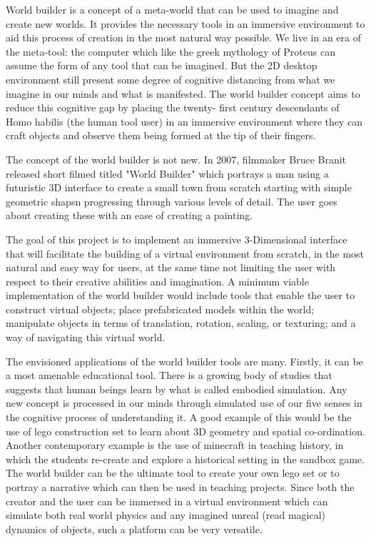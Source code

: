 World builder is a concept of a meta-world that can be used to imagine and create new worlds. It provides the necessary tools in an immersive
environment to aid this process of creation in the most natural way possible. We live in an era of the meta-tool: the computer which like the greek 
mythology of Proteus can assume the form of any tool that can be imagined. But the 2D desktop environment still present some degree of cognitive 
distancing from what we imagine in our minds and what is manifested. The world builder concept aims to reduce this cognitive gap by placing the twenty-
first century descendants of Homo habilis (the human tool user) in an immersive environment where they can craft objects and observe them being formed
at the tip of their fingers.


The concept of the world builder is not new. In 2007, filmmaker Bruce Branit released short filmed titled "World Builder" \cite{video:WorldBuilder}
which portrays a man using a futuristic 3D interface to create a small town from scratch starting with simple geometric shapsn progressing through
various levels of detail.  The user goes about creating these with an ease of creating a painting.


The goal of this project is to implement an immersive 3-Dimensional interface that will facilitate the building of a virtual environment from scratch, in
the most natural and easy way for users, at the same time not limiting the user with respect to their creative abilities and imagination. A 
minimum viable implementation of the world builder would include tools that enable the user to construct virtual objects; place prefabricated models 
within the world; manipulate objects in terms of translation, rotation, scaling, or texturing; and a way of navigating this virtual world.


The envisioned applications of the world builder tools are many. Firstly, it can be a most amenable educational tool. There is a growing body of studies 
that suggests that human beings learn by what is called embodied simulation. Any new concept is processed in our minds through simulated use of our five
senses in the cognitive process of understanding it. A good example of this would be the use of lego construction set to learn about 3D geometry and 
spatial co-ordination.  Another contemporary example is the use of minecraft in teaching history, in which the students re-create and explore a 
historical setting in the sandbox game. The world builder can be the ultimate tool to create your own lego set or to portray a narrative which can then
be used in teaching projects. Since both the creator and the user can be immersed in a virtual environment which can simulate both real world physics 
and any imagined unreal (read magical) dynamics of objects, such a platform can be very versatile. 


